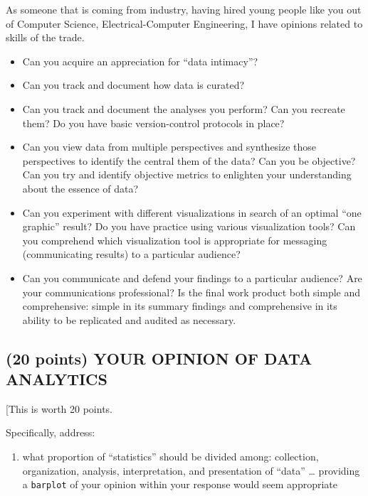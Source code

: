 \documentclass[
]{article}
\providecommand{\tightlist}{%
  \setlength{\itemsep}{0pt}\setlength{\parskip}{0pt}}
\begin{document}
As someone that is coming from industry, having hired young people like
you out of Computer Science, Electrical-Computer Engineering, I have
opinions related to skills of the trade.

\begin{itemize}
\tightlist
\item
  Can you acquire an appreciation for ``data intimacy''?
\item
  Can you track and document how data is curated?
\item
  Can you track and document the analyses you perform? Can you recreate
  them? Do you have basic version-control protocols in place?
\item
  Can you view data from multiple perspectives and synthesize those
  perspectives to identify the central them of the data? Can you be
  objective? Can you try and identify objective metrics to enlighten
  your understanding about the essence of data?
\item
  Can you experiment with different visualizations in search of an
  optimal ``one graphic'' result? Do you have practice using various
  visualization tools? Can you comprehend which visualization tool is
  appropriate for messaging (communicating results) to a particular
  audience?
\item
  Can you communicate and defend your findings to a particular audience?
  Are your communications professional? Is the final work product both
  simple and comprehensive: simple in its summary findings and
  comprehensive in its ability to be replicated and audited as
  necessary.
\end{itemize}

\hypertarget{points-your-opinion-of-data-analytics}{%
\subsection{(20 points) YOUR OPINION OF DATA
ANALYTICS}\label{points-your-opinion-of-data-analytics}}

{[}This is worth 20 points.

Specifically, address:

\begin{enumerate}
\def\labelenumi{(\arabic{enumi})}
\tightlist
\item
  what proportion of ``statistics'' should be divided among: collection,
  organization, analysis, interpretation, and presentation of ``data''
  \ldots{} providing a \texttt{barplot} of your opinion within your
  response would seem appropriate
\end{enumerate}
\end{document}
